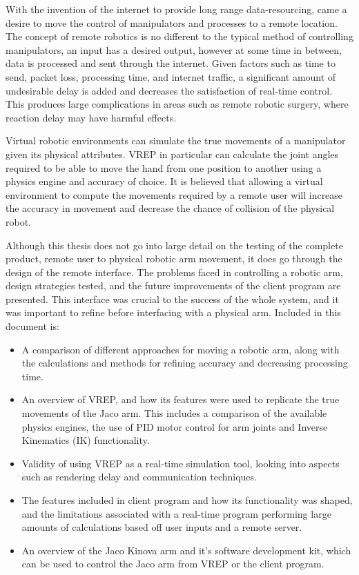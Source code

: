 \documentclass[12pt,openany,a4paper]{book}
\begin{document}
With the invention of the internet to provide long range data-resourcing, came a desire to move the control of manipulators and processes to a remote location. The concept of remote robotics is no different to the typical method of controlling manipulators, an input has a desired output, however at some time in between, data is processed and sent through the internet. Given factors such as time to send, packet loss, processing time, and internet traffic, a significant amount of undesirable delay is added and decreases the satisfaction of real-time control. This produces large complications in areas such as remote robotic surgery, where reaction delay may have harmful effects.

Virtual robotic environments can simulate the true movements of a manipulator given its physical attributes. VREP in particular can calculate the joint angles required to be able to move the hand from one position to another using a physics engine and accuracy of choice. It is believed that allowing a virtual environment to compute the movements required by a remote user will increase the accuracy in movement and decrease the chance of collision of the physical robot.

Although this thesis does not go into large detail on the testing of the complete product, remote user to physical robotic arm movement, it does go through the design of the remote interface. The problems faced in controlling a robotic arm, design strategies tested, and the future improvements of the client program are presented. This interface was crucial to the success of the whole system, and it was important to refine before interfacing with a physical arm. Included in this document is:

\begin{itemize}
	\item A comparison of different approaches for moving a robotic arm, along with the calculations and methods for refining accuracy and decreasing processing time.
	\item An overview of VREP, and how its features were used to replicate the true movements of the Jaco arm. This includes a comparison of the available physics engines, the use of PID motor control for arm joints and Inverse Kinematics (IK) functionality. 
	\item Validity of using VREP as a real-time simulation tool, looking into aspects such as rendering delay and communication techniques.
	\item The features included in client program and how its functionality was shaped, and the limitations associated with a real-time program performing large amounts of calculations based off user inputs and a remote server.
	\item An overview of the Jaco Kinova arm and it's software development kit, which can be used to control the Jaco arm from VREP or the client program.


\end{itemize}
\end{document}
